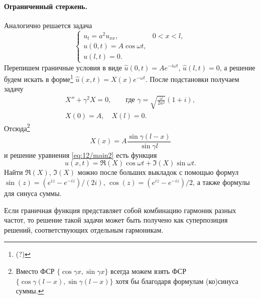 \paragraph{Ограниченный стержень.}
Аналогично решается задача  
\begin{equation}
  \label{eq:12/main2}
  \begin{cases}
    u_t = a^2 u_{xx}, & 0 < x < l,\\
    u(0, t) = A\cos\omega t,\\
    u(l, t) = 0.
  \end{cases}
\end{equation}
Перепишем граничные условия в виде $ \hat u(0, t) = Ae^{-i\omega t} $, $ \hat
u(l, t) = 0 $, а решение будем искать в форме\footnote{(?)} $ \hat u(x, t) =
X(x)e^{-\omega t} $. После подстановки получаем задачу
\begin{gather*}
  X'' + \gamma^2X =0,\qquad \text{где }\gamma = \sqrt{
  \frac{\omega}{2a^2}}(1+i),\\
  X(0) = A,\quad
  X(l) = 0.
\end{gather*}
Отсюда\footnote{Вместо ФСР $ \{\cos \gamma x, \sin \gamma x\} $ всегда можем
взять ФСР $ \{\cos\gamma(l-x), \sin\gamma(l-x)\} $ хотя бы благодаря формулам
(ко)синуса суммы.}
\[
    X(x) = A \frac{\sin\gamma(l-x)}{\sin\gamma l}
\]
и решение уравнения \eqref{eq:12/main2} есть функция 
\[
  u(x, t) = \Re(X)\cos\omega t + \Im(X)\sin\omega t.
\]
Найти $ \Re (X) $, $ \Im(X) $ можно после больших выкладок с помощью формул $
\sin(z) = (e^{iz} - e^{-iz})/(2i) $, $ \cos(z)= (e^{iz} - e^{-iz})/2$, а также
формулы для синуса суммы.



Если граничная функция представляет собой комбинацию 
гармоник разных частот, то решение такой задачи может быть получено как
суперпозиция решений, соответствующих отдельным гармоникам.
